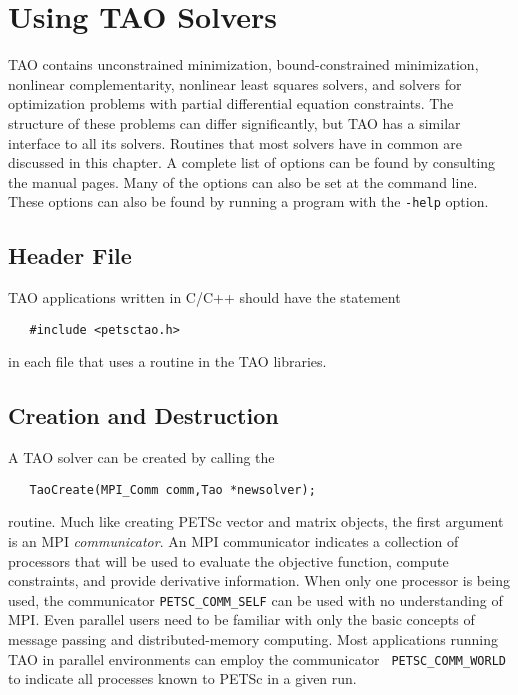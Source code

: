 %
%

\chapter{Using TAO Solvers}
\label{chapter:tao_solver}

TAO contains unconstrained minimization, bound-constrained minimization, 
nonlinear complementarity, nonlinear least squares solvers, and solvers
for optimization problems with partial differential equation constraints.
The structure of these problems can differ significantly, but TAO has a 
similar interface to all its solvers.  
Routines that most solvers have in common are discussed in 
this chapter.
A complete list of options can be found by consulting the manual pages.
Many of the options can also be set at the command line.  These options
can also be found by
running a program with the {\tt -help} option.

\section{Header File}

TAO applications written in C/C++ should have the statement 
\begin{verbatim}
   #include <petsctao.h>
\end{verbatim}
\noindent
in each file that uses a routine in the TAO libraries.


\section{Creation and Destruction}

A TAO solver can be created by calling the
\begin{verbatim}
   TaoCreate(MPI_Comm comm,Tao *newsolver);
\end{verbatim}
routine. 
Much like creating PETSc vector and matrix objects, 
the first argument is an MPI {\em communicator}.
An MPI \cite{using-mpi} communicator
indicates a collection of processors that will be used to evaluate the
objective function, compute constraints, and provide derivative information.
When only one processor is being used, the communicator {\tt PETSC\_COMM\_SELF}
can be used with no understanding of MPI.
Even parallel users need to be familiar with only the basic concepts 
of message passing and  distributed-memory computing. 
Most applications running TAO in
parallel environments can employ the communicator {\tt
PETSC\_COMM\_WORLD} to indicate all processes known to PETSc in a given run.

